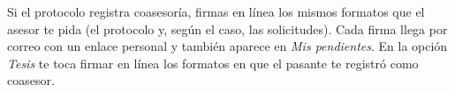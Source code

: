 \documentclass[11pt,a4paper]{article}
\begin{document}
{\small\tableofcontents}
\newpage
\begin{quevasahacer}
Si el protocolo registra coasesoría, firmas en línea los mismos formatos que el asesor te pida (el protocolo y, según el caso, las solicitudes). Cada firma llega por correo con un enlace personal y también aparece en \emph{Mis pendientes}. En la opción \emph{Tesis} te toca firmar en línea los formatos en que el pasante te registró como coasesor.
\end{quevasahacer}



\end{document}
